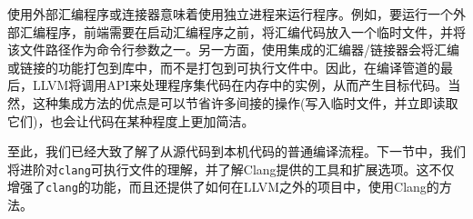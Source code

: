\begin{tcolorbox}[colback=blue!5!white,colframe=blue!75!black, fonttitle=\bfseries,title=外部与集成]
\hspace*{0.7cm}使用外部汇编程序或连接器意味着使用独立进程来运行程序。例如，要运行一个外部汇编程序，前端需要在启动汇编程序之前，将汇编代码放入一个临时文件，并将该文件路径作为命令行参数之一。另一方面，使用集成的汇编器/链接器会将汇编或链接的功能打包到库中，而不是打包到可执行文件中。因此，在编译管道的最后，LLVM将调用API来处理程序集代码在内存中的实例，从而产生目标代码。当然，这种集成方法的优点是可以节省许多间接的操作(写入临时文件，并立即读取它们)，也会让代码在某种程度上更加简洁。
\end{tcolorbox}

至此，我们已经大致了解了从源代码到本机代码的普通编译流程。下一节中，我们将进阶对\texttt{clang}可执行文件的理解，并了解Clang提供的工具和扩展选项。这不仅增强了\texttt{clang}的功能，而且还提供了如何在LLVM之外的项目中，使用Clang的方法。





























